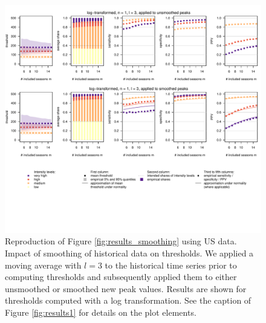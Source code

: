\documentclass[12pt]{article}
\begin{document}
\begin{figure}[h!]
\centering
\includegraphics[width=1\textwidth]{figure/plot_smoothing3_us_small.pdf}

\caption{Reproduction of Figure \ref{fig:results_smoothing} using US data. Impact of smoothing of historical data on thresholds. We applied a moving average with $l = 3$ to the historical time series prior to computing thresholds and subsequently applied them to either unsmoothed or smoothed new peak values. Results are shown for thresholds computed with a log transformation. See the caption of Figure \ref{fig:results1} for details on the plot elements.}
\label{fig:results_smoothing_us}
\end{figure}

\newpage
\end{document}
